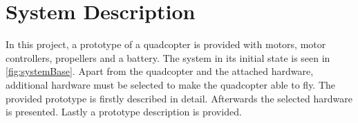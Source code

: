 \chapter{System Description}\label{cha:Systemdescription}
In this project, a prototype of a quadcopter is provided with motors, motor controllers, propellers and a battery. The system in its initial state is seen in \autoref{fig:systemBase}. Apart from the quadcopter and the attached hardware, additional hardware must be selected to make the quadcopter able to fly. The provided prototype is firstly described in detail. Afterwards the selected hardware is presented. Lastly a prototype description is provided.   



%
